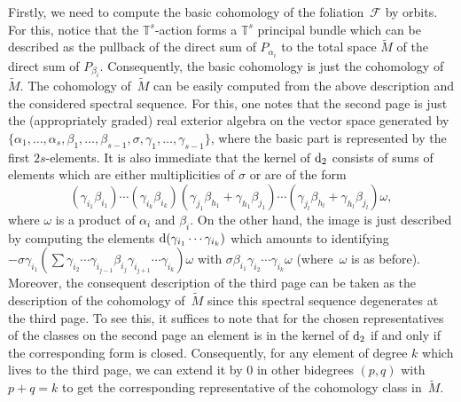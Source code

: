 \documentclass[pdftex]{sigma}
\numberwithin{equation}{section}
\theoremstyle{definition}
\begin{document}
Firstly, we need to compute the basic cohomology of the foliation~$\mathcal{F}$ by orbits. For this, notice that the $\mathbb{T}^s$-action forms a $\mathbb{T}^s$ principal bundle which can be described as the pullback of the direct sum of $P_{\alpha_i}$ to the total space $\tilde{M}$ of the direct sum of $P_{\beta_i}$. Consequently, the basic cohomology is just the cohomology of~$\tilde{M}$. The cohomology of~$\tilde{M}$ can be easily computed from the above description and the considered spectral sequence. For this, one notes that the second page is just the (appropriately graded) real exterior algebra on the vector space generated by $\{\alpha_1,\dots,\alpha_s,\beta_1,\dots,\beta_{s-1},\sigma,\gamma_1,\dots,\gamma_{s-1}\}$, where the basic part is represented by the first $2s$-elements. It is also immediate that the kernel of ${\rm d}_2$ consists of sums of elements which are either multiplicities of $\sigma$ or are of the form
\[(\gamma_{i_1}\beta_{i_1})\cdots (\gamma_{i_k}\beta_{i_k})(\gamma_{j_1}\beta_{h_1}+\gamma_{h_1}\beta_{j_1})\cdots (\gamma_{j_l}\beta_{h_l}+\gamma_{h_l}\beta_{j_l})\omega,\]
where $\omega$ is a product of $\alpha_i$ and $\beta_i$. On the other hand, the image is just described by computing the elements ${\rm d}(\gamma_{i_1}\cdots \gamma_{i_k})$ which amounts to identifying $-\sigma\gamma_{i_1}(\sum \gamma_{i_2}\cdots \gamma_{i_{j-1}}\beta_{i_j}\gamma_{i_{j+1}}\cdots \gamma_{i_k})\omega$ with $\sigma\beta_{i_1}\gamma_{i_2}\cdots \gamma_{i_k}\omega$ (where~$\omega$ is as before). Moreover, the consequent description of the third page can be taken as the description of the cohomology of~$\tilde{M}$ since this spectral sequence degenerates at the third page. To see this, it suffices to note that for the chosen representatives of the classes on the second page an element is in the kernel of ${\rm d}_2$ if and only if the corresponding form is closed. Consequently, for any element of degree $k$ which lives to the third page, we can extend it by $0$ in other bidegrees $(p,q)$ with $p+q=k$ to get the corresponding representative of the cohomology class in~$\tilde{M}$.
\end{document}
